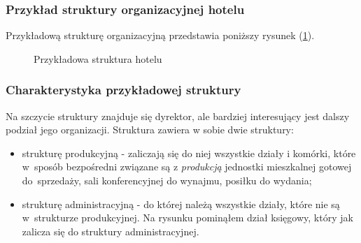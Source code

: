 \documentclass[a4paper,onecolumn,oneside,11pt,wide,floatssmall]{mwrep}
\theoremstyle{definition}
\theoremstyle{plain}%
\theoremstyle{remark}
\begin{document}
\subsubsection{Przykład struktury organizacyjnej hotelu}
Przykładową strukturę organizacyjną przedstawia poniższy rysunek 
(\ref{fig:struktura-hotelu}).

\begin{figure}[H]
  \begin{center}
  \end{center}
  \caption{Przykładowa struktura hotelu}
  \label{fig:struktura-hotelu}
\end{figure}

\subsubsection{Charakterystyka przykładowej struktury}
Na szczycie struktury znajduje się dyrektor, ale bardziej interesujący jest dalszy 
podział jego organizacji. Struktura zawiera w sobie dwie struktury:
\begin{itemize}
  \item strukturę produkcyjną - zaliczają się do niej wszystkie działy i 
  komórki, które \mbox{w sposób} bezpośredni związane są z \emph{produkcją}
  jednostki mieszkalnej gotowej \mbox{do sprzedaży}, sali konferencyjnej do 
  wynajmu, posiłku do wydania;
  \item strukturę administracyjną - do której należą wszystkie działy, które
   nie są \mbox{w strukturze} produkcyjnej. Na rysunku pominąłem dział księgowy, 
   który jak zalicza się do struktury administracyjnej.
\end{itemize}
\end{document}
